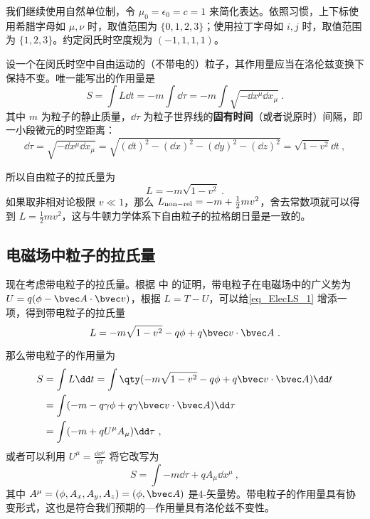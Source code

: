 
我们继续使用自然单位制，令 $\mu_0=\epsilon_0=c=1$ 来简化表达。依照习惯，上下标使用希腊字母如 $\mu, \nu$ 时，取值范围为 $\{0, 1, 2, 3\}$；使用拉丁字母如 $i, j$ 时，取值范围为 $\{1, 2, 3\}$。约定闵氏时空度规为 $(-1,1,1,1)$。

设一个在闵氏时空中自由运动的（不带电的）粒子，其作用量应当在洛伦兹变换下保持不变。唯一能写出的作用量是
\begin{equation}
S=\int L\dd t=-m\int \dd \tau=-m\int \sqrt{-\dd x^\mu \dd x_\mu}~.
\end{equation}
其中 $m$ 为粒子的静止质量，$\dd \tau$ 为粒子世界线的\textbf{固有时间}（或者说原时）间隔，即一小段微元的时空距离：
\begin{equation}
\dd \tau=\sqrt{-\dd x^\mu\dd x_\mu}=\sqrt{(\dd t)^2-(\dd x)^2-(\dd y)^2-(\dd z)^2}=\sqrt{1-v^2}\dd t~,
\end{equation}

所以自由粒子的拉氏量为
\begin{equation}\label{eq_ElecLS_1}
L=-m\sqrt{1-v^2}~.
\end{equation}
如果取非相对论极限 $v\ll 1$，那么 $L_{\rm{non-rel}}=-m+\frac{1}{2}mv^2$，舍去常数项就可以得到 $L=\frac{1}{2}mv^2$，这与牛顿力学体系下自由粒子的拉格朗日量是一致的。
\subsection{电磁场中粒子的拉氏量}
现在考虑带电粒子的拉氏量。根据 中  的证明，带电粒子在电磁场中的广义势为 $U=q(\phi-\bvec A\cdot \bvec v)$，根据 $L=T-U$，可以给\autoref{eq_ElecLS_1} 增添一项，得到带电粒子的拉氏量
\begin{equation}\label{eq_ElecLS_2}
L=-m\sqrt{1-v^2}-q\phi+q\bvec v\cdot \bvec A~.
\end{equation}

那么带电粒子的作用量为
\begin{equation}\label{eq_ElecLS_3}
\begin{aligned}
S&=\int L\dd t=\int \qty(-m\sqrt{1-v^2}-q\phi +q\bvec v\cdot \bvec A)\dd t\\
&=\int (-m-q\gamma\phi+q\gamma\bvec v\cdot \bvec A)\dd \tau\\
&=\int (-m+qU^\mu A_\mu)\dd \tau~,
\end{aligned}
\end{equation}
或者可以利用 $U^\mu= \frac{\dd x^\mu}{\dd \tau}$ 将它改写为
\begin{equation}\label{eq_ElecLS_4}
S=\int -m\dd \tau+qA_\mu \dd x^\mu~,
\end{equation}
其中 $A^\mu=(\phi,A_x,A_y,A_z)=(\phi,\bvec A)$ 是4-矢量势。带电粒子的作用量具有协变形式，这也是符合我们预期的—作用量具有洛伦兹不变性。

